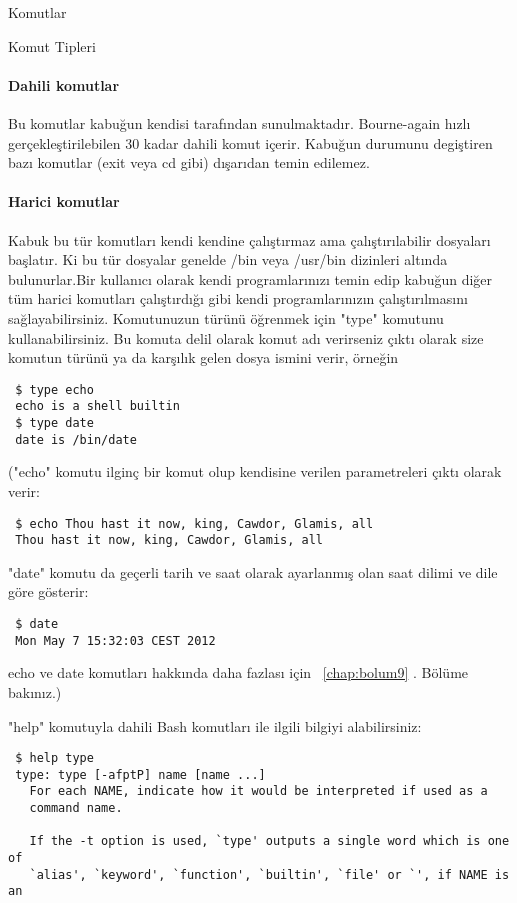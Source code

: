 \begin{section}{Komutlar}
\begin{subsection}{Komut Tipleri}
\paragraph{Dahili komutlar}{Bu komutlar kabuğun kendisi tarafından sunulmaktadır. Bourne-again hızlı gerçekleştirilebilen 30 kadar dahili komut içerir. Kabuğun durumunu degiştiren bazı komutlar (exit veya cd gibi) dışarıdan temin edilemez.}
\paragraph{Harici komutlar}{Kabuk bu tür komutları kendi kendine çalıştırmaz ama çalıştırılabilir dosyaları başlatır. Ki bu tür dosyalar genelde /bin veya /usr/bin dizinleri altında bulunurlar.Bir kullanıcı olarak kendi programlarınızı temin edip kabuğun diğer tüm harici komutları çalıştırdığı gibi kendi programlarınızın çalıştırılmasını sağlayabilirsiniz. Komutunuzun türünü öğrenmek için "type" komutunu kullanabilirsiniz. Bu komuta delil olarak komut adı verirseniz çıktı olarak size komutun türünü ya da karşılık gelen dosya ismini verir, örneğin}
\begin{verbatim}
 $ type echo
 echo is a shell builtin
 $ type date
 date is /bin/date
\end{verbatim}

("echo" komutu ilginç bir komut olup kendisine verilen parametreleri çıktı olarak verir:

\begin{verbatim}
 $ echo Thou hast it now, king, Cawdor, Glamis, all
 Thou hast it now, king, Cawdor, Glamis, all
\end{verbatim}

"date" komutu da geçerli tarih ve saat olarak ayarlanmış olan saat dilimi ve dile göre gösterir:

\begin{verbatim}
 $ date
 Mon May 7 15:32:03 CEST 2012
\end{verbatim}

echo ve date komutları hakkında daha fazlası için ~\ref{chap:bolum9} . Bölüme bakınız.)

"help" komutuyla dahili Bash komutları ile ilgili bilgiyi alabilirsiniz: 
\begin{verbatim}
 $ help type
 type: type [-afptP] name [name ...]
   For each NAME, indicate how it would be interpreted if used as a
   command name.
   
   If the -t option is used, `type' outputs a single word which is one of
   `alias', `keyword', `function', `builtin', `file' or `', if NAME is an
\end{verbatim}

\end{subsection}
\end{section}
